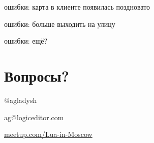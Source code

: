 \documentclass[aspectratio=169,handout,bigger]{beamer}
\begin{document}
\begin{frame}{ошибки: карта в клиенте появилась поздновато}
\end{frame}


\begin{frame}{ошибки: больше выходить на улицу}
\end{frame}


\begin{frame}{ошибки: ещё?}
\end{frame}


\section*{Вопросы?}

\begin{frame}

\begin{center}
\Huge{@agladysh}
\end{center}

\begin{center}
\Large{ag@logiceditor.com}
\end{center}

\begin{center}
\href{http://meetup.com/Lua-in-Moscow}{meetup.com/Lua-in-Moscow}
\end{center}

\end{frame}

\end{document}

